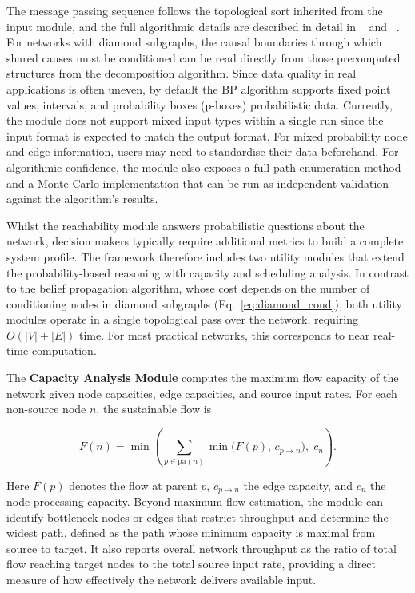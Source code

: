 \documentclass[twocolumn]{rps-esrel2026}
\begin{document}
The message passing sequence follows the topological sort inherited from the input module, and the full algorithmic details are described in detail in ~\cite{infoprop2026} and ~\cite{infoprop2026_julia}. For networks with diamond subgraphs, the causal boundaries through which shared causes must be conditioned can be read directly from those precomputed structures from the decomposition algorithm. Since data quality in real applications is often uneven, by default the BP algorithm supports fixed point values, intervals, and probability boxes (p-boxes) probabilistic data. 
Currently, the module does not support mixed input types within a single run since the input format is expected to match the output format. For mixed probability node and edge information, users may need to standardise their data beforehand. For algorithmic confidence, the module also exposes a full path enumeration method and a Monte Carlo implementation that can be run as independent validation against the algorithm’s results.

Whilst the reachability module answers probabilistic questions about the network, decision makers typically require additional metrics to build a complete system profile. The framework therefore includes two utility modules that extend the probability-based reasoning with capacity and scheduling analysis. In contrast to the belief propagation algorithm, whose cost depends on the number of conditioning nodes in diamond subgraphs (Eq.~\ref{eq:diamond_cond}), both utility modules operate in a single topological pass over the network, requiring $O(|V| + |E|)$ time. For most practical networks, this corresponds to near real-time computation.

The \textbf{Capacity Analysis Module} computes the maximum flow capacity of the network given node capacities, edge capacities, and source input rates. For each non-source node $n$, the sustainable flow is

\begin{equation}\label{eq:maxflow}
F(n) = \min\!\left(\sum_{p \in \mathrm{pa}(n)}
\min\bigl(F(p),\, c_{p \to n}\bigr),\; c_n\right).
\end{equation}

Here $F(p)$ denotes the flow at parent $p$, $c_{p \to n}$ the edge capacity, and $c_n$ the node processing capacity. Beyond maximum flow estimation, the module can identify bottleneck nodes or edges that restrict throughput and determine the widest path, defined as the path whose minimum capacity is maximal from source to target. It also reports overall network throughput as the ratio of total flow reaching target nodes to the total source input rate, providing a direct measure of how effectively the network delivers available input. 
\end{document}
